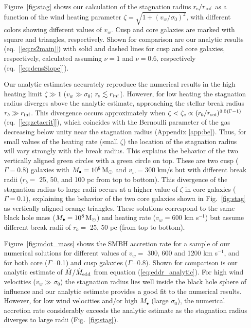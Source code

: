 \documentclass[usenatbib,fleqn]{mn2e}
\newcommand{\rb}{r_b}
\newcommand{\Mbh}[1][]{M_{\bullet#1}}
\newcommand{\vwO}{v_{w}}
\newcommand{\densSlope}{\nu}
\begin{document}
Figure~\ref{fig:stag} shows our calculation of the stagnation radius
$r_{\rm s}/r_{\rm inf}$ as a function of the wind heating parameter
$\zeta = \sqrt{1+(v_w/\sigma_0)^{2}}$, with different colors
showing different values of $v_{w}$.  Cusp and core galaxies are
marked with square and triangles, respectively.  Shown for comparison
are our analytic results (eq.~[\ref{eq:rs2main}]) with solid and
dashed lines for cusp and core galaxies, respectively, calculated
assuming $\densSlope = 1$ and $\densSlope= 0.6$, respectively
(eq.~[\ref{eq:densSlope}]).

Our analytic estimates accurately reproduce the numerical results in
the high heating limit $\zeta \gg 1$ ($v_w \gg \sigma_0$; $r_{\rm s}
\lesssim r_{\rm inf}$).  However, for low heating the stagnation
radius diverges above the analytic estimate, approaching the stellar
break radius $r_b \gg r_{\rm inf}$.  This divergence occurs
approximately when $\zeta < \zeta_c \propto (r_b/r_{\rm
  soi})^{0.5(\Gamma-1)}$ (eq.~[\ref{eq:zetacrit}]), which coincides
with the Bernoulli parameter of the gas decreasing below unity near
the stagnation radius (Appendix \ref{app:be}).  Thus, for small values
of the heating rate (small $\zeta$) the location of the stagnation
radius will vary strongly with the break radius. This explains the
behavior of the two vertically aligned green circles with a green
circle on top. These are two cusp ($\Gamma=0.8$) galaxies with
$\Mbh=10^8 \Msun$ and $v_w=300$ km/s but with different break radii
($\rb=$ 25, 50, and 100 pc from top to bottom). This divergence of the
stagnation radius to large radii occurs at a higher value of $\zeta$
in core galaxies ($\Gamma = 0.1$), explaining the behavior of the two
core galaxies shown in Fig.~\ref{fig:stag} as vertically aligned
orange triangles.  These solutions correspond to the same black hole
mass ($\Mbh = 10^8 \Msun$) and heating rate ($v_w = 600$ km s$^{-1}$)
but assume different break radii of $r_{b} =$ 25, 50 pc (from top to
bottom).

Figure~\ref{fig:mdot_mass} shows the SMBH accretion rate for a sample of
our numerical solutions for different values of
$\vwO =$ 300, 600 and 1200 km s$^{-1}$, and for both core
($\Gamma$=0.1) and cusp galaxies ($\Gamma$=0.8).  Shown for comparison
is our analytic estimate of $\dot{M}/\dot{M}_{\rm edd}$ from equation
(\ref{eq:eddr_analytic}).  For high wind velocities ($v_{w} \gg
\sigma_0$) the stagnation radius lies well inside the black hole sphere of
influence and our analytic estimate provides a good fit to the
numerical results.  However, for low wind velocities and/or high
$M_{\bullet}$ (large $\sigma_0$), the numerical accretion rate
considerably exceeds the analytic estimate as the stagnation radius
diverges to large radii (Fig.~\ref{fig:stag}).
\end{document}

